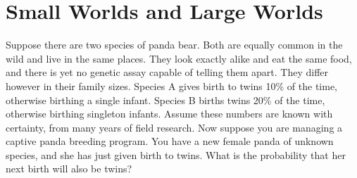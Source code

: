 \chapter{Small Worlds and Large Worlds}

\begin{exer}
Suppose there are two species of panda bear. Both are equally common in the 
wild and live in the same places. They look exactly alike and eat the same 
food, and there is yet no genetic assay capable of telling them apart. They 
differ however in their family sizes. Species A gives birth to twins 10\% of 
the time, otherwise birthing a single infant. Species B births twins 20\% of 
the time, otherwise birthing singleton infants. Assume these numbers are 
known with certainty, from many years of field research.
Now suppose you are managing a captive panda breeding program. You have a new 
female panda of unknown species, and she has just given birth to twins. What 
is the probability that her next birth will also be twins?
\end{exer}

